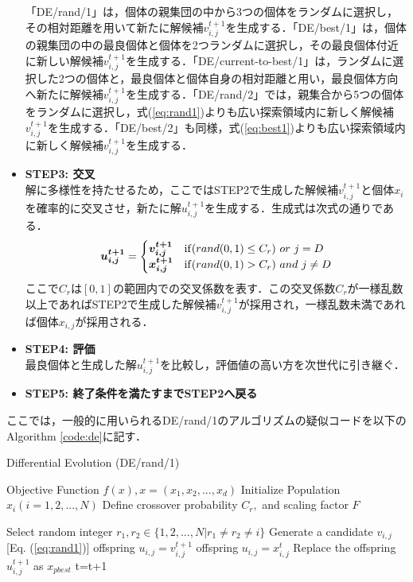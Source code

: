 \documentclass[a4j,11pt]{jarticle}
\begin{document}
\begin{itemize}
「DE/rand/1」は，個体の親集団の中から3つの個体をランダムに選択し，その相対距離を用いて新たに解候補$v_{i,j}^{t+1}$を生成する．「DE/best/1」は，個体の親集団の中の最良個体と個体を2つランダムに選択し，その最良個体付近に新しい解候補$v_{i,j}^{t+1}$を生成する．「DE/current-to-best/1」は，ランダムに選択した2つの個体と，最良個体と個体自身の相対距離と用い，最良個体方向へ新たに解候補$v_{i,j}^{t+1}$を生成する．「DE/rand/2」では，親集合から5つの個体をランダムに選択し，式(\ref{eq:rand1})よりも広い探索領域内に新しく解候補$v_{i,j}^{t+1}$を生成する．「DE/best/2」も同様，式(\ref{eq:best1})よりも広い探索領域内に新しく解候補$v_{i,j}^{t+1}$を生成する．

\item {\bf STEP3: 交叉} \\
解に多様性を持たせるため，ここではSTEP2で生成した解候補$v_{i,j}^{t+1}$と個体$x_i$を確率的に交叉させ，新たに解$u_{i,j}^{t+1}$を生成する．生成式は次式の通りである．
\begin{equation}
\mbox{\boldmath $u_{i,j}^{t+1}$}=\begin{cases}
\mbox{\boldmath $v_{i,j}^{t+1}$} & {\rm if}(rand(0,1) \leq C_r) \ or \ j=D \\
\mbox{\boldmath $x_{i,j}^{t+1}$} & {\rm if}(rand(0,1) > C_r) \ and \ j \neq D
\end{cases}
\end{equation}
ここで$C_r$は$[0,1]$の範囲内での交叉係数を表す．この交叉係数$C_r$が一様乱数以上であればSTEP2で生成した解候補$v_{i,j}^{t+1}$が採用され，一様乱数未満であれば個体$x_{i,j}$が採用される．

\item {\bf STEP4: 評価} \\
最良個体と生成した解$u_{i,j}^{t+1}$を比較し，評価値の高い方を次世代に引き継ぐ．

\item {\bf STEP5: 終了条件を満たすまでSTEP2へ戻る}
\end{itemize}

ここでは，一般的に用いられるDE/rand/1のアルゴリズムの疑似コードを以下のAlgorithm \ref{code:de}に記す．

\begin{algorithm}[H]
\caption{Differential Evolution (DE/rand/1)}
\label{code:de}
\begin{algorithmic}[3]
\REQUIRE Objective Function $f(x), x=(x_1,x_2,...,x_d)$
\STATE Initialize Population $x_i (i=1,2,...,N)$ 
\STATE Define crossover probability $C_r,$ and scaling factor $F$

\STATE Select random integer $r_1, r_2 \in \{ 1,2,..., N| r_1 \neq r_2 \neq i\}$
\STATE Generate a candidate $v_{i,j}$  [Eq. (\ref{eq:rand1})]
\STATE offspring $u_{i,j} = v_{i,j}^{t+1}$
\STATE offspring $u_{i,j} = x_{i,j}^t$
\ENDIF
\ENDFOR
{}
\STATE Replace the offspring $u_{i,j}^{t+1}$ as $x_{pbest}$
\ENDIF
\ENDFOR
\STATE t=t+1
\ENDWHILE
\end{algorithmic}
\end{algorithm}
\end{document}
